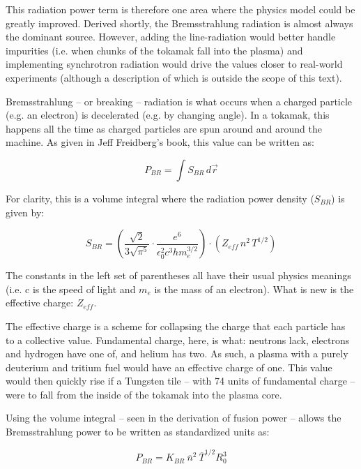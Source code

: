 \documentclass[11pt]{book}
\begin{document}
This radiation power term is therefore one area where the physics model could be greatly improved. Derived shortly, the Bremsstrahlung radiation is almost always the dominant source. However, adding the line-radiation would better handle impurities (i.e. when chunks of the tokamak fall into the plasma) and implementing synchrotron radiation would drive the values closer to real-world experiments (although a description of which is outside the scope of this text).

Bremsstrahlung -- or breaking -- radiation is what occurs when a charged particle (e.g. an electron) is decelerated (e.g. by changing angle). In a tokamak, this happens all the time as charged particles are spun around and around the machine. As given in Jeff Freidberg's book, this value can be written as:

\begin{equation}
	P_{BR} = \int S_{BR} \, d \vec{r}
\end{equation}

For clarity, this is a volume integral where the radiation power density ($S_{BR}$) is given by:

\begin{equation}
	S_{BR} = \left( \frac{\sqrt{2}}{3 \sqrt{\pi^5}} \cdot \frac{e^6}{\epsilon_0^2 c^3 h m_e^{3/2}} \right) \cdot \left( Z_{eff} \, n^2 \, T^{1/2} \right)
\end{equation}

The constants in the left set of parentheses all have their usual physics meanings (i.e. c is the speed of light and $m_e$ is the mass of an electron). What is new is the effective charge: $Z_{eff}$.

The effective charge is a scheme for collapsing the charge that each particle has to a collective value. Fundamental charge, here, is what: neutrons lack, electrons and hydrogen have one of, and helium has two. As such, a plasma with a purely deuterium and tritium fuel would have an effective charge of one. This value would then quickly rise if a Tungsten tile -- with 74 units of fundamental charge -- were to fall from the inside of the tokamak into the plasma core.

Using the volume integral -- seen in the derivation of fusion power -- allows the Bremsstrahlung power to be written as standardized units as:

\begin{equation}
	\label{eq:pbr}
	P_{BR} = K_{BR} \ \overline n ^ 2 \ \overline T ^ {1/2} R_0^3 
\end{equation}
\end{document}
